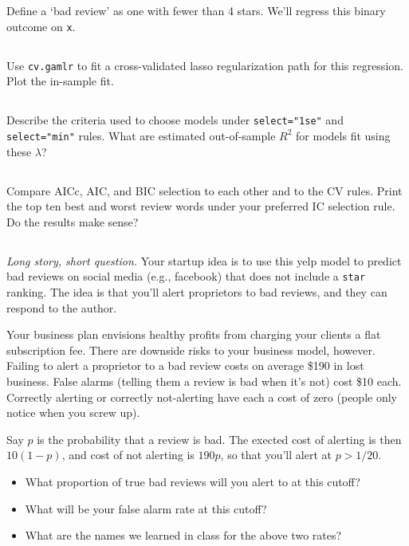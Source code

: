 \documentclass[12pt]{article}
\begin{document}
Define a `bad review' as one with fewer than 4 stars.  We'll regress this binary outcome on {\tt x}.  

\subsection{} Use {\tt cv.gamlr} to fit a cross-validated lasso 
regularization path for this regression.  \\Plot the in-sample fit.

\subsection{} Describe the criteria used to choose models under {\tt select="1se"} and {\tt select="min"} rules.  What are estimated out-of-sample $R^2$ for models fit using these $\lambda$?

\subsection{} Compare AICc, AIC, and BIC selection to each other and to the CV rules.  Print the top ten best and worst review words under your preferred IC selection rule.  Do the results make sense?

\subsection{}  {\it Long story, short question.}  Your startup idea is to use this yelp model to predict bad reviews on social media (e.g., facebook) that does not include a {\tt star} ranking.  The idea is that you'll alert proprietors to bad reviews, and they can respond to the author.  

\medskip \noindent 
Your business plan envisions healthy profits from charging your clients a flat subscription fee. There are downside risks to your business model, however. Failing to alert a proprietor to a bad review costs on average \$190 in lost business.  False alarms (telling them a review is bad when it's not) cost \$10 each.  Correctly alerting or correctly not-alerting have each a cost of zero (people only notice when you screw up).

\medskip
\noindent Say $p$ is the probability that a review is bad.  The exected cost of alerting is then $10(1-p)$, and cost of not alerting is $190p$, so that you'll alert at $p > 1/20$.
\begin{itemize}
\item What proportion of true bad reviews will you alert to at this cutoff?
\item What will be your false alarm rate at this cutoff?
\item What are the names we learned in class for the above two rates?
\end{itemize}
 
\end{document}
